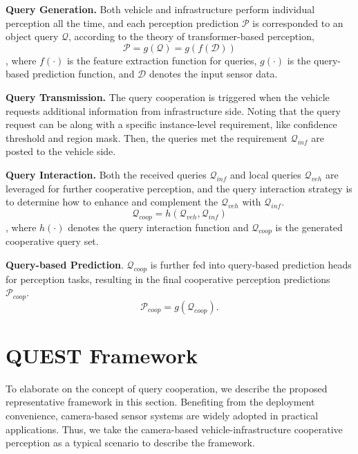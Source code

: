 \documentclass[letterpaper, 10 pt, conference]{ieeeconf}  %
\begin{document}
\textbf{Query Generation.} Both vehicle and infrastructure perform individual perception all the time, and each perception prediction $\mathcal{P}$ is corresponded to an object query $\mathcal{Q}$, according to the theory of transformer-based perception,
\begin{equation}
  \mathcal{P} = g(\mathcal{Q}) = g(f(\mathcal{D}))
\end{equation},
where $f(\cdot)$ is the feature extraction function for queries, $g(\cdot)$ is the query-based prediction function, and $\mathcal{D}$ denotes the input sensor data. 

\textbf{Query Transmission.} The query cooperation is triggered when the vehicle requests additional information from infrastructure side. Noting that the query request can be along with a specific instance-level requirement, like confidence threshold and region mask. Then, the queries met the requirement $\mathcal{Q}_{inf}$ are posted to the vehicle side. 

\textbf{Query Interaction.} Both the received queries $\mathcal{Q}_{inf}$ and local queries $\mathcal{Q}_{veh}$ are leveraged for further cooperative perception, and the query interaction strategy is to determine how to enhance and complement the $\mathcal{Q}_{veh}$ with $\mathcal{Q}_{inf}$.
\begin{equation}
  \mathcal{Q}_{coop} = h(\mathcal{Q}_{veh}, \mathcal{Q}_{inf})
\end{equation},
where $h(\cdot)$ denotes the query interaction function and $\mathcal{Q}_{coop}$ is the generated cooperative query set. 

\textbf{Query-based Prediction}. $\mathcal{Q}_{coop}$ is further fed into query-based prediction heads for perception tasks, resulting in the final cooperative perception predictions $\mathcal{P}_{coop}$.
\begin{equation}
  \mathcal{P}_{coop} = g(\mathcal{Q}_{coop}).
\end{equation}

\section{QUEST Framework}

To elaborate on the concept of query cooperation, we describe the proposed representative framework in this section. Benefiting from the deployment convenience, camera-based sensor systems are widely adopted in practical applications. Thus, we take the camera-based vehicle-infrastructure cooperative perception as a typical scenario to describe the framework.
\end{document}
